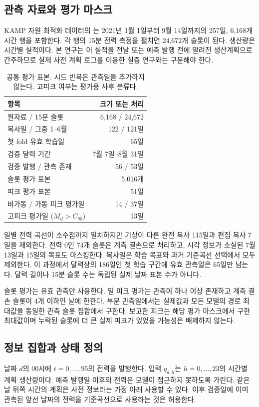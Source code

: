 \documentclass[letterpaper]{article}
\begin{document}
\subsection{관측 자료와 평가 마스크}
KAMP 자원 최적화 데이터의 는 2021년 1월 1일부터 9월 14일까지의 257일, 6,168개 시간 행을 포함한다. 각 행의 15분 전력 측정을 펼치면 24,672개 슬롯이 된다. 생산량은 시간별 실적이다. 본 연구는 이 실적을 전날 또는 예측 발행 전에 알려진 생산계획으로 간주하므로 실제 사전 계획 로그를 이용한 실증 연구와는 구분해야 한다.

\begin{table}[t]
\centering\small
\begin{tabular}{@{}lr@{}}
\toprule
항목 & 크기 또는 처리 \\
\midrule
원자료 / 15분 슬롯 & 6,168 / 24,672 \\
복사일 / 그중 1--6월 & 122 / 121일 \\
첫 fold 유효 학습일 & 65일 \\
검증 달력 기간 & 7월 7일--8월 31일 \\
검증 발행 / 관측 존재 & 56 / 53일 \\
슬롯 평가 표본 & 5,016개 \\
피크 평가 표본 & 51일 \\
비가동 / 가동 피크 평가일 & 14 / 37일 \\
고피크 평가일 ($M_d>C_{90}$) & 13일 \\
\bottomrule
\end{tabular}
\caption{공통 평가 표본. 시드 반복은 관측일을 추가하지 않는다. 고피크 여부는 평가용 사후 분류다.}
\label{tab:data}
\end{table}

일별 전력 곡선이 소수점까지 일치하지만 기상이 다른 완전 복사 115일과 편집 복사 7일을 제외한다. 전력 0인 74개 슬롯은 계측 결손으로 처리하고, 시각 정보가 소실된 7월 13일과 15일의 목표도 마스킹한다. 복사일은 학습 목표와 과거 기준곡선 선택에서 모두 제외한다. 이 과정에서 달력상의 186일인 첫 학습 구간에 유효 관측일은 65일만 남는다. 달력 길이나 15분 슬롯 수는 독립된 실제 날짜 표본 수가 아니다.

슬롯 평가는 유효 관측만 사용한다. 일 피크 평가는 관측이 하나 이상 존재하고 계측 결손 슬롯이 4개 이하인 날에 한한다. 부분 관측일에서는 실제값과 모든 모델의 경로 최대값을 동일한 관측 슬롯 집합에서 구한다. 보고한 피크는 해당 평가 마스크에서 구한 최대값이며 누락된 슬롯에 더 큰 실제 피크가 있었을 가능성은 배제하지 않는다.

\subsection{정보 집합과 상태 정의}
날짜 $d$의 00시에 $t=0,\ldots,95$의 전력을 발행한다. 입력 $q_{d,h}$는 $h=0,\ldots,23$의 시간별 계획 생산량이다. 예측 발행일 이후의 전력은 모델이 접근하지 못하도록 가린다. 같은 날 뒤쪽 시간의 계획은 사전 정보라는 가정 아래 사용할 수 있다. 이후 검증일에 이미 관측된 앞선 날짜의 전력을 기준곡선으로 사용하는 것은 허용한다.
\end{document}
